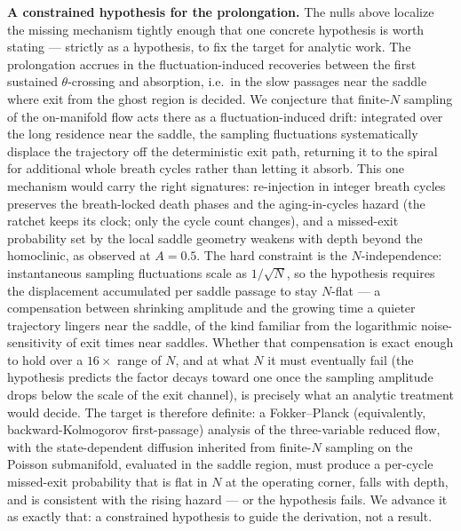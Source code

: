 \documentclass[pdflatex,sn-mathphys,Numbered]{sn-jnl}
\begin{document}
\textbf{A constrained hypothesis for the prolongation.} The nulls above localize
the missing mechanism tightly enough that one concrete hypothesis is worth
stating --- strictly as a hypothesis, to fix the target for analytic work. The
prolongation accrues in the fluctuation-induced recoveries between the first
sustained $\theta$-crossing and absorption, i.e.\ in the slow passages near the
saddle where exit from the ghost region is decided. We conjecture that finite-$N$
sampling of the on-manifold flow acts there as a fluctuation-induced drift:
integrated over the long residence near the saddle, the sampling fluctuations
systematically displace the trajectory off the deterministic exit path, returning
it to the spiral for additional whole breath cycles rather than letting it
absorb. This one mechanism would carry the right signatures: re-injection in
integer breath cycles preserves the breath-locked death phases and the
aging-in-cycles hazard (the ratchet keeps its clock; only the cycle count
changes), and a missed-exit probability set by the local saddle geometry weakens
with depth beyond the homoclinic, as observed at $A = 0.5$. The hard constraint
is the $N$-independence: instantaneous sampling fluctuations scale as
$1/\sqrt N$, so the hypothesis requires the displacement accumulated per saddle
passage to stay $N$-flat --- a compensation between shrinking amplitude and the
growing time a quieter trajectory lingers near the saddle, of the kind familiar
from the logarithmic noise-sensitivity of exit times near saddles. Whether that
compensation is exact enough to hold over a $16\times$ range of $N$, and at what
$N$ it must eventually fail (the hypothesis predicts the factor decays toward one
once the sampling amplitude drops below the scale of the exit channel), is
precisely what an analytic treatment would decide. The target is therefore
definite: a Fokker--Planck (equivalently, backward-Kolmogorov first-passage)
analysis of the three-variable reduced flow, with the state-dependent diffusion
inherited from finite-$N$ sampling on the Poisson submanifold, evaluated in the
saddle region, must produce a per-cycle missed-exit probability that is flat in
$N$ at the operating corner, falls with depth, and is consistent with the rising
hazard --- or the hypothesis fails. We advance it as exactly that: a constrained
hypothesis to guide the derivation, not a result.
\end{document}
